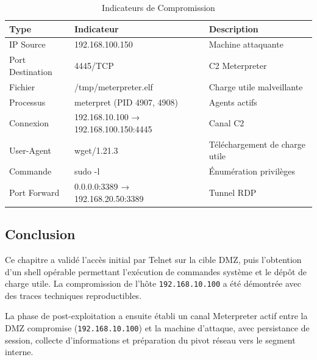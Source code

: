 \documentclass[12pt,a4paper,openany]{report}
\newcommand{\tableheadcolor}{\rowcolor{tableheadbg}}
\begin{document}
	\begin{table}[H]
		\centering
		\small
		\renewcommand{\arraystretch}{1.3}
		\setlength{\arrayrulewidth}{0.5pt}
		\begin{tabular}{p{3.5cm} p{4cm} p{5cm}}
			\arrayrulecolor{tableborder}
			\hline
			\tableheadcolor
			\textcolor{tableheadfg}{\textbf{Type}} &
			\textcolor{tableheadfg}{\textbf{Indicateur}} &
			\textcolor{tableheadfg}{\textbf{Description}} \\
			\hline
			\rowcolor{tablerowalt}
			IP Source & 192.168.100.150 & Machine attaquante \\
			Port Destination & 4445/TCP & C2 Meterpreter \\
			\rowcolor{tablerowalt}
			Fichier & /tmp/meterpreter.elf & Charge utile malveillante \\
			Processus & meterpret (PID 4907, 4908) & Agents actifs \\
			\rowcolor{tablerowalt}
			Connexion & 192.168.10.100 → 192.168.100.150:4445 & Canal C2 \\
			User-Agent & wget/1.21.3 & Téléchargement de charge utile \\
			\rowcolor{tablerowalt}
			Commande & sudo -l & Énumération privilèges \\
			Port Forward & 0.0.0.0:3389 → 192.168.20.50:3389 & Tunnel RDP \\
			\hline
		\end{tabular}
		\caption{Indicateurs de Compromission}
		\label{tab:iocs}
	\end{table}
	
	
	
	\subsection{Conclusion}
	
	Ce chapitre a validé l'accès initial par Telnet sur la cible DMZ, puis l'obtention d'un shell opérable permettant l'exécution de commandes système et le dépôt de charge utile. La compromission de l'hôte \texttt{192.168.10.100} a été démontrée avec des traces techniques reproductibles.
	
	La phase de post-exploitation a ensuite établi un canal Meterpreter actif entre la DMZ compromise (\texttt{192.168.10.100}) et la machine d'attaque, avec persistance de session, collecte d'informations et préparation du pivot réseau vers le segment interne.
	
\end{document}
